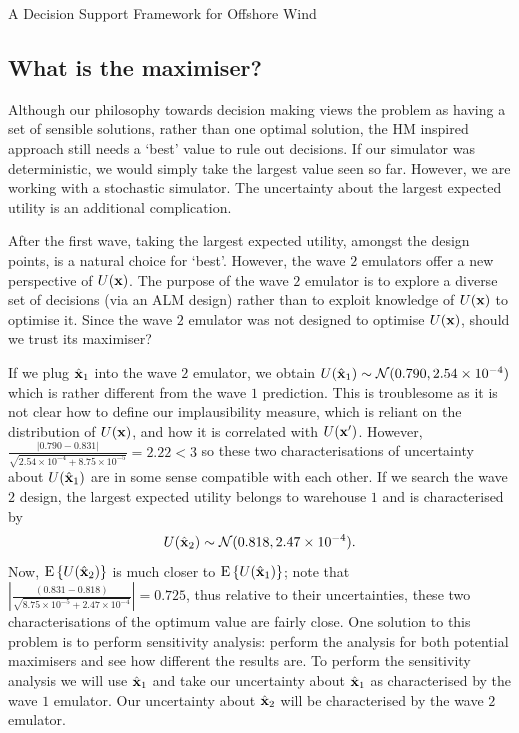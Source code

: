 \begin{chapter}{A Decision Support Framework for Offshore Wind \label{Ch:ds-for-ow}}
\subsection{What is the maximiser?}
Although our philosophy towards decision making views the problem as having a set of sensible solutions, rather than one optimal solution, the HM inspired approach still needs a `best' value to rule out decisions. If our simulator was deterministic, we would simply take the largest value seen so far. However, we are working with a stochastic simulator. The uncertainty about the largest expected utility is an additional complication.

After the first wave, taking the largest expected utility, amongst the design points, is a natural choice for `best'. However, the wave $2$ emulators offer a new perspective of $U(\mathbf{x})$. The purpose of the wave $2$ emulator is to explore a diverse set of decisions (via an ALM design) rather than to exploit knowledge of $U(\mathbf{x})$ to optimise it. Since the wave $2$ emulator was not designed to optimise $U(\mathbf{x})$, should we trust its maximiser?

If we plug $\hat{\mathbf{x}}_1$ into the wave $2$ emulator, we obtain $U(\hat{\mathbf{x}}_1) \sim \mathcal{N}(0.790, 2.54\times10^{-4})$ which is rather different from the wave $1$ prediction. This is troublesome as it is not clear how to define our implausibility measure, which is reliant on the distribution of $U(\mathbf{x})$, and how it is correlated with $U(\mathbf{x}')$. However, $\tfrac{|0.790 - 0.831|}{\sqrt{2.54\times10^{-4} + 8.75\times 10^{-5}}} = 2.22 < 3$ so these two characterisations of uncertainty about $U(\hat{\mathbf{x}}_1)$ are in some sense compatible with each other. If we search the wave $2$ design, the largest expected utility belongs to warehouse $1$ and is characterised by
\begin{equation}
 U(\hat{\mathbf{x}}_2) \sim \mathcal{N}(0.818, 2.47 \times 10^{-4}).
\end{equation}
Now, $\textrm{E}\, \{ U(\hat{\mathbf{x}}_2) \}$ is much closer to $\textrm{E}\,\{U(\hat{\mathbf{x}}_1)\}$; note that $|\tfrac{(0.831 - 0.818)}{\sqrt{8.75 \times 10^{-5} + 2.47 \times 10^{-4}}} | = 0.725$, thus relative to their uncertainties, these two characterisations of the optimum value are fairly close.
One solution to this problem is to perform sensitivity analysis: perform the analysis for both potential maximisers and see how different the results are. To perform the sensitivity analysis we will use $\hat{\mathbf{x}}_1$ and take our uncertainty about $\hat{\mathbf{x}}_1$ as characterised by the wave $1$ emulator. Our uncertainty about $\hat{\mathbf{x}}_2$ will be characterised by the wave $2$ emulator.


\end{chapter}
